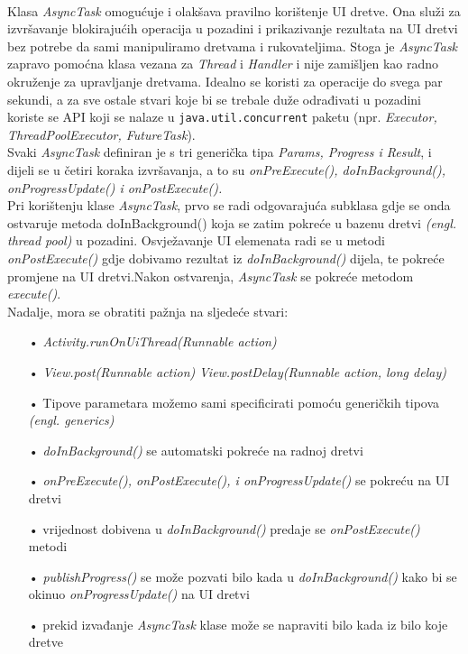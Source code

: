 \documentclass[times, utf8, zavrsni]{fer}
\begin{document}
\paragraph{}
Klasa \textit{AsyncTask} omogućuje i olakšava pravilno korištenje UI dretve. Ona služi za izvršavanje blokirajućih operacija u pozadini i prikazivanje rezultata na UI dretvi bez potrebe da sami manipuliramo dretvama i rukovateljima. Stoga je \textit{AsyncTask} zapravo pomoćna klasa vezana za \textit{Thread} i \textit{Handler} i nije zamišljen kao radno okruženje za upravljanje dretvama. Idealno se koristi za operacije do svega par sekundi, a za sve ostale stvari koje bi se trebale duže odrađivati u pozadini koriste se API koji se nalaze u \verb|java.util.concurrent| paketu (npr. \textit{Executor, ThreadPoolExecutor, FutureTask}).\\

Svaki \textit{AsyncTask} definiran je s tri generička tipa \textit{Params, Progress i Result}, i dijeli se u četiri koraka izvršavanja, a to su \textit{onPreExecute(), doInBackground(), onProgressUpdate() i onPostExecute().}\\

Pri korištenju klase \textit{AsyncTask}, prvo se radi odgovarajuća subklasa gdje se onda ostvaruje metoda doInBackground() koja se zatim pokreće u bazenu dretvi \textit{(engl. thread pool)} u pozadini. Osvježavanje UI elemenata radi se u metodi \textit{onPostExecute()} gdje dobivamo rezultat iz \textit{doInBackground()} dijela, te pokreće promjene na UI dretvi.\linebreak Nakon ostvarenja, \textit{AsyncTask} se pokreće metodom \textit{execute()}.\\

Nadalje, mora se obratiti pažnja na sljedeće stvari:

\begin{itemize}
\item[•] \textit{Activity.runOnUiThread(Runnable action)}
\item[•] \textit{View.post(Runnable action)}
 \textit{View.postDelay(Runnable action, long delay)}

\item[•] Tipove parametara možemo sami specificirati pomoću generičkih tipova \textit{(engl. generics)}
\item[•] \textit{doInBackground()} se automatski pokreće na radnoj dretvi
\item[•] \textit{onPreExecute(), onPostExecute(), i onProgressUpdate()} se pokreću na UI dretvi
\item[•] vrijednost dobivena u \textit{doInBackground()} predaje se \textit{onPostExecute()} metodi
\item[•] \textit{publishProgress()} se može pozvati bilo kada u \textit{doInBackground()} kako bi se okinuo \textit{onProgressUpdate()} na UI dretvi
\item[•] prekid izvađanje \textit{AsyncTask} klase može se napraviti bilo kada iz bilo koje dretve\newpage
\end{itemize}
\end{document}
